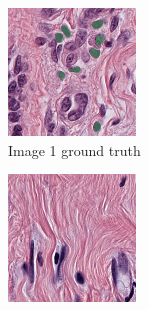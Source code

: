 \begin{figure}[H]
  \begin{subfigure}[b]{0.32\textwidth}
    \centering
    \includegraphics[width=\linewidth]{assets/images/for_presentation/exp4-1-gt.png}
    \caption{Image 1 ground truth}
  \end{subfigure}\hfill
  \begin{subfigure}[b]{0.32\textwidth}
    \centering
    \includegraphics[width=\linewidth]{assets/images/for_presentation/exp4-2-gt.png}

\end{subfigure}
\end{figure}

